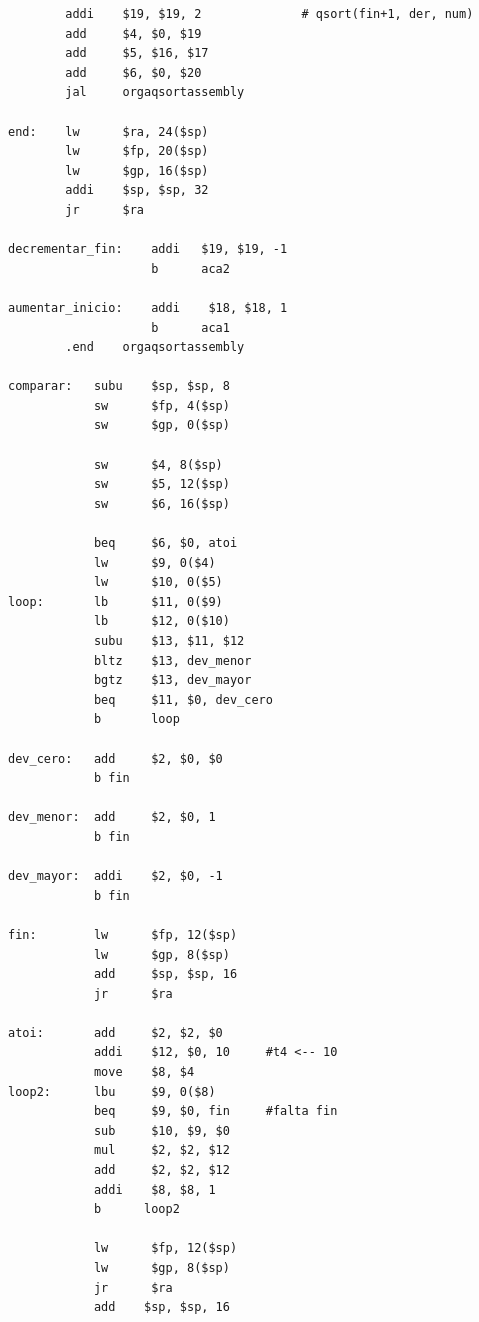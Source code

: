 \documentclass[a4paper, 12pt]{article}
\begin{document}
\begin{verbatim}
        addi    $19, $19, 2              # qsort(fin+1, der, num)
        add     $4, $0, $19
        add     $5, $16, $17
        add     $6, $0, $20
        jal     orgaqsortassembly
        
end:    lw      $ra, 24($sp)
        lw      $fp, 20($sp)
        lw      $gp, 16($sp)
        addi    $sp, $sp, 32
        jr      $ra

decrementar_fin:    addi   $19, $19, -1
                    b      aca2

aumentar_inicio:    addi    $18, $18, 1
                    b      aca1
		.end    orgaqsortassembly

comparar:   subu    $sp, $sp, 8
            sw      $fp, 4($sp)
            sw      $gp, 0($sp)

            sw      $4, 8($sp)
            sw      $5, 12($sp)
            sw      $6, 16($sp)

            beq     $6, $0, atoi
            lw      $9, 0($4)
            lw      $10, 0($5)
loop:       lb      $11, 0($9)
            lb      $12, 0($10)
            subu    $13, $11, $12
            bltz    $13, dev_menor
            bgtz    $13, dev_mayor
            beq     $11, $0, dev_cero
            b       loop

dev_cero:   add     $2, $0, $0
            b fin

dev_menor:  add     $2, $0, 1
            b fin

dev_mayor:  addi    $2, $0, -1
            b fin

fin:        lw      $fp, 12($sp)
            lw      $gp, 8($sp)
            add	    $sp, $sp, 16
            jr      $ra

atoi:       add     $2, $2, $0
            addi    $12, $0, 10     #t4 <-- 10
            move    $8, $4
loop2:      lbu     $9, 0($8)
            beq     $9, $0, fin     #falta fin
            sub     $10, $9, $0
            mul     $2, $2, $12
            add     $2, $2, $12
            addi    $8, $8, 1
            b      loop2

            lw      $fp, 12($sp)
            lw      $gp, 8($sp)
            jr      $ra
            add    $sp, $sp, 16
	\end{verbatim}
	
\end{document}
